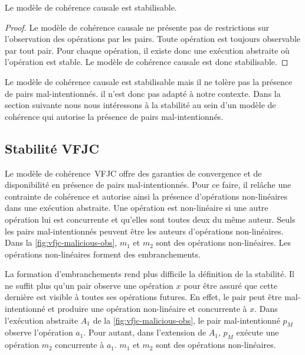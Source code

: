 \begin{theorem}\label{th:stabilizable-causal}
Le modèle de cohérence causale est stabilisable.
\end{theorem}

\begin{proof}
Le modèle de cohérence causale ne présente pas de restrictions sur l'observation des opérations par les pairs.
Toute opération est toujours observable par tout pair.
Pour chaque opération, il existe donc une exécution abstraite où l'opération est stable.
Le modèle de cohérence causale est donc stabilisable.
\end{proof}

Le modèle de cohérence causale est stabilisable mais il ne tolère pas la présence de pairs mal-intentionnés.
il n'est donc pas adapté à notre contexte.
Dans la section suivante nous nous intéressons à la stabilité au sein d'un modèle de cohérence qui autorise la présence de pairs mal-intentionnés.


\subsection{Stabilité \acl{VFJC}}\label{subsec:vfjcs}

Le modèle de cohérence~\acf{VFJC} offre des garanties de convergence et de disponibilité en présence de pairs mal-intentionnés.
Pour ce faire, il relâche une contrainte de cohérence et autorise ainsi la présence d'opérations non-linéaires dans une exécution abstraite.
Une opération est non-linéaire si une autre opération lui est concurrente et qu'elles sont toutes deux du même auteur.
Seuls les pairs mal-intentionnés peuvent être les auteurs d'opérations non-linéaires.
Dans la \autoref{fig:vfjc-malicious-obs}, $m_1$ et $m_2$ sont des opérations non-linéaires.
Les opérations non-linéaires forment des embranchements.

La formation d'embranchements rend plus difficile la définition de la stabilité.
Il ne suffit plus qu'un pair observe une opération $x$ pour être assuré que cette dernière est visible à toutes ses opérations futures.
En effet, le pair peut être mal-intentionné et produire une opération non-linéaire et concurrente à $x$.
Dans l'exécution abstraite $A_1$ de la \autoref{fig:vfjc-malicious-obs}, le pair mal-intentionné $p_M$ observe l'opération $a_1$.
Pour autant, dans l'extension de $A_1$, $p_M$ exécute une opération $m_2$ concurrente à $a_1$. $m_1$ et $m_2$ sont des opérations non-linéaires.

